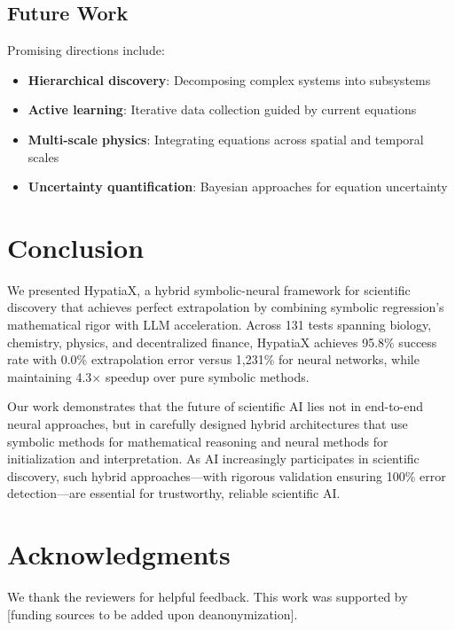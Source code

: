 \documentclass[twoside,11pt]{article}
\begin{document}
\subsection{Future Work}

Promising directions include:

\begin{itemize}
\item \textbf{Hierarchical discovery}: Decomposing complex systems into subsystems
\item \textbf{Active learning}: Iterative data collection guided by current equations
\item \textbf{Multi-scale physics}: Integrating equations across spatial and temporal scales
\item \textbf{Uncertainty quantification}: Bayesian approaches for equation uncertainty
\end{itemize}

\section{Conclusion}
\label{sec:conclusion}

We presented HypatiaX, a hybrid symbolic-neural framework for scientific discovery that achieves perfect extrapolation by combining symbolic regression's mathematical rigor with LLM acceleration. Across 131 tests spanning biology, chemistry, physics, and decentralized finance, HypatiaX achieves 95.8\% success rate with 0.0\% extrapolation error versus 1,231\% for neural networks, while maintaining 4.3$\times$ speedup over pure symbolic methods.

Our work demonstrates that the future of scientific AI lies not in end-to-end neural approaches, but in carefully designed hybrid architectures that use symbolic methods for mathematical reasoning and neural methods for initialization and interpretation. As AI increasingly participates in scientific discovery, such hybrid approaches—with rigorous validation ensuring 100\% error detection—are essential for trustworthy, reliable scientific AI.

\section*{Acknowledgments}

We thank the reviewers for helpful feedback. This work was supported by [funding sources to be added upon deanonymization].



\end{document}
